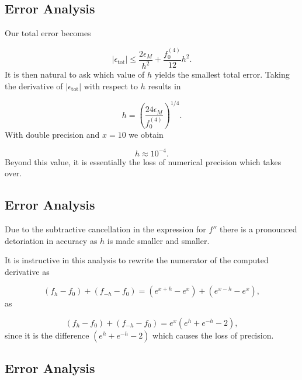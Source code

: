 \documentclass[%
twoside,                 %
final,                   %
10pt]{article}
\newenvironment{block_mdfboxadmon}[1][]{
\begin{block_mdfboxmdframed}[frametitle=#1]
}
{
\end{block_mdfboxmdframed}
}
\begin{document}
\subsection{Error Analysis}


\begin{block_mdfboxadmon}[]
Our total error becomes

\[
   \left|\epsilon_{\mbox{tot}}\right|\le  \frac{2 \epsilon_M}{h^2} +
                          \frac{f_0^{(4)}}{12}h^{2}.
    \label{eq:experror}
\]
It is then natural to ask which value of $h$ yields the smallest
total error. Taking the derivative of $\left|\epsilon_{\mbox{tot}}\right|$
with respect to $h$ results in

\[
   h= \left(\frac{ 24\epsilon_M}{f_0^{(4)}}\right)^{1/4}.
\]
With double precision and $x=10$ we obtain

\[
   h\approx 10^{-4}.
\]
Beyond this value, it is essentially the loss of numerical precision
which takes over.
\end{block_mdfboxadmon}



\subsection{Error Analysis}


\begin{block_mdfboxadmon}[]
Due to the subtractive cancellation in the expression
for $f''$ there is a pronounced detoriation in accuracy as $h$ is made smaller
and smaller.

It is instructive in this analysis to rewrite the numerator of
the computed derivative as

\[
   (f_h -f_0) +(f_{-h}-f_0)=(e^{x+h}-e^{x}) + (e^{x-h}-e^{x}),
\]
as

\[
   (f_h -f_0) +(f_{-h}-f_0)=e^x(e^{h}+e^{-h}-2),
\]
since it is the difference $(e^{h}+e^{-h}-2)$ which causes
the loss of precision.
\end{block_mdfboxadmon}



\subsection{Error Analysis}
\end{document}
